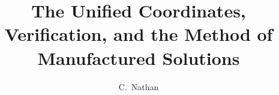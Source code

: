 \documentclass[defaultstyle,11pt]{thesis}
\title{The Unified Coordinates, Verification, and the Method of 
  Manufactured Solutions}
\author{C.~Nathan}{Woods}
\begin{document}
\graphicspath{{../images/}}











\appendix



\end{document}
